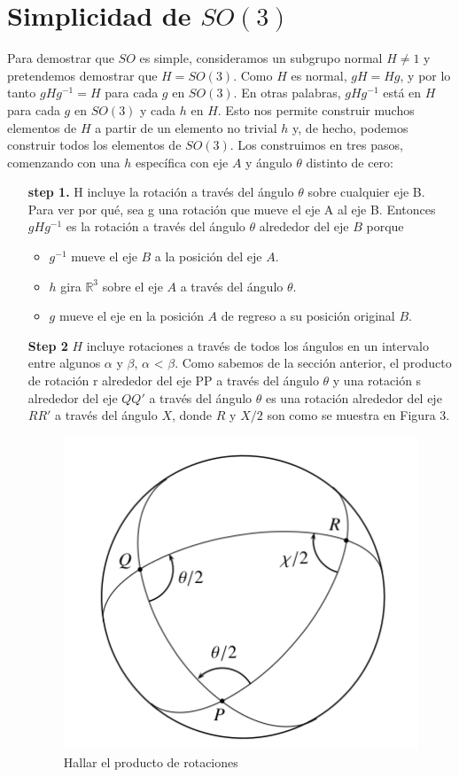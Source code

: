 \documentclass[11pt]{book}
\numberwithin{equation}{section}
\theoremstyle{plain}  %
\begin{document}
\section{Simplicidad de $SO(3)$}

Para demostrar que $SO$ es simple, consideramos un subgrupo
normal $H \not = {1}$ y pretendemos demostrar que $H = SO(3)$. Como $H$ es
normal, $gH = Hg$, 
y por lo tanto $gHg^{-1} = H$
para cada $g$ en
$SO(3)$. 
En otras palabras, 
$gHg^{-1}$ está en $H$ para
cada $g$ en $SO(3)$
y cada $h$ en $H$. Esto nos permite construir muchos elementos de $H$
a partir de un elemento no trivial $h$ y, de hecho, podemos
construir todos los elementos de $SO( 3)$. Los construimos en
tres pasos, comenzando con una $h$ específica con eje $A$ y ángulo
$\theta$ distinto de cero:
\begin{itemize}
    \item[\textbf{step 1.}] H incluye la rotación a través del ángulo $\theta$ sobre cualquier eje B. \\ 
    Para ver por qué, sea g una rotación que mueve el eje A al eje B. Entonces $gHg^{-1}$ es la rotación a través del ángulo $\theta$ alrededor del eje $B$ porque
    \begin{itemize}
        \item $g^{-1}$ mueve el eje $B$ a la posición del eje $A$.
        \item $h$ gira $\mathbb{R}^{3}$ sobre el eje $A$ a través del ángulo $\theta$.
        \item $g$ mueve el eje en la posición $A$ de regreso a su posición original $B$.
    \end{itemize} 
    \item[\textbf{Step 2}] $H$ incluye rotaciones a través de todos los ángulos en un intervalo entre algunos $\alpha$ y $\beta$, $\alpha$ < $\beta$.
    Como sabemos de la sección anterior, el producto de 
    rotación r alrededor del eje PP a través del ángulo $\theta$ y una
    rotación s alrededor del eje $QQ'$ a través del ángulo $\theta$ es
    una rotación alrededor del eje $RR'$ a través del ángulo $X$,
    donde $R$ y $X/2$ son como se muestra en Figura 3.
    
    \begin{figure}[h]
\centering
\includegraphics[scale=0.5]{imagenes/23.4.png}
\caption{Hallar el producto de rotaciones}
\end{figure}


\end{itemize}
\end{document}
